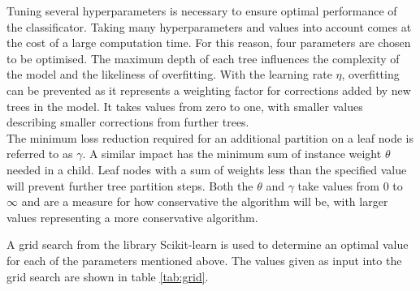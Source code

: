 Tuning several hyperparameters is necessary to ensure optimal performance of the classificator. Taking many hyperparameters and values into account comes at the
cost of a large computation time. For this reason, four parameters are chosen to be optimised. The maximum depth of each tree influences the
complexity of the model and the likeliness of overfitting. With the learning rate $\eta$, overfitting can be prevented as it represents a weighting factor for
corrections added by new trees in the model. It takes values from zero to one, with smaller values describing smaller corrections from further trees. \\
The minimum loss reduction required for an additional partition on a leaf node is referred to as $\gamma$. A similar impact has the minimum sum of instance weight $\theta$
needed in a child. Leaf nodes with a sum of weights less than the specified value will prevent further tree partition steps.
Both the $\theta$ and $\gamma$ take values from 0 to $\infty$ and are a measure for how conservative the algorithm will be, with larger values representing a more
conservative algorithm.

A grid search from the library Scikit-learn \cite{scikit} is used to determine an optimal value for each of the parameters mentioned above. The values given as input into the grid search
are shown in table \ref{tab:grid}.

